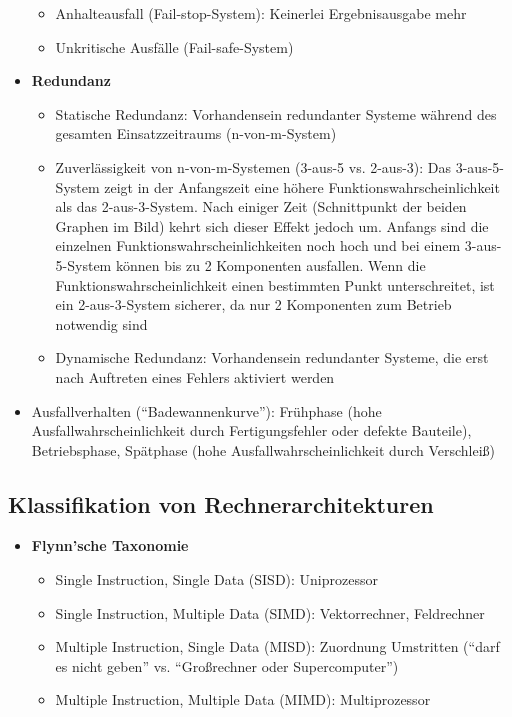 \begin{itemize}
\begin{itemize}
		\item Anhalteausfall (Fail-stop-System): Keinerlei Ergebnisausgabe mehr
		\item Unkritische Ausfälle (Fail-safe-System)
	\end{itemize}
	\item \textbf{Redundanz}
	\begin{itemize}
		\item Statische Redundanz: Vorhandensein redundanter Systeme während des gesamten Einsatzzeitraums (n-von-m-System)
		\item Zuverlässigkeit von n-von-m-Systemen (3-aus-5 vs. 2-aus-3): Das 3-aus-5-System zeigt in der Anfangszeit eine höhere Funktionswahrscheinlichkeit als das 2-aus-3-System. Nach einiger Zeit (Schnittpunkt der beiden Graphen im Bild) kehrt sich dieser Effekt jedoch um. Anfangs sind die einzelnen Funktionswahrscheinlichkeiten noch hoch und bei einem 3-aus-5-System können bis zu 2 Komponenten ausfallen. Wenn die Funktionswahrscheinlichkeit einen bestimmten Punkt unterschreitet, ist ein 2-aus-3-System sicherer, da nur 2 Komponenten zum Betrieb notwendig sind
		\item Dynamische Redundanz: Vorhandensein redundanter Systeme, die erst nach Auftreten eines Fehlers aktiviert werden
	\end{itemize}
	\item Ausfallverhalten ("`Badewannenkurve"'): Frühphase (hohe Ausfallwahrscheinlichkeit durch Fertigungsfehler oder defekte Bauteile), Betriebsphase, Spätphase (hohe Ausfallwahrscheinlichkeit durch Verschleiß)
\end{itemize}


\subsection{Klassifikation von Rechnerarchitekturen}
\begin{itemize}
	\item \textbf{Flynn'sche Taxonomie}
	\begin{itemize}
		\item Single Instruction, Single Data (SISD): Uniprozessor
		\item Single Instruction, Multiple Data (SIMD): Vektorrechner, Feldrechner
		\item Multiple Instruction, Single Data (MISD): Zuordnung Umstritten ("`darf es nicht geben"' vs. "`Großrechner oder Supercomputer"')
		\item Multiple Instruction, Multiple Data (MIMD): Multiprozessor
	\end{itemize}
\end{itemize}



